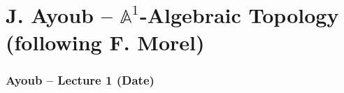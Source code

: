 \part{J. Ayoub -- $\mathbb{A}^{1}$-Algebraic Topology (following F. Morel)}
\section{Ayoub -- Lecture 1 (Date)}